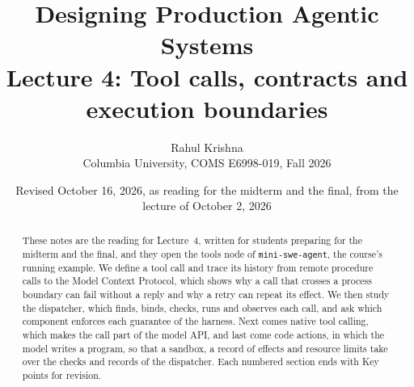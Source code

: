 \documentclass[9pt,twocolumn]{extarticle}
\title{Designing Production Agentic Systems\\Lecture 4: Tool calls, contracts and execution boundaries}
\author{Rahul Krishna\\Columbia University, COMS E6998-019, Fall 2026}
\date{Revised October 16, 2026, as reading for the midterm and the final, from the lecture of October 2, 2026}
\theoremstyle{definition}
\newcommand{\msa}{\texttt{mini-swe-agent}}     %
\begin{document}
\maketitle
\begin{abstract}
These notes are the reading for Lecture~4, written for students preparing for the midterm and the
final, and they open the tools node of \msa{}, the course's running example. We define a tool call
and trace its history from remote procedure calls to the Model Context Protocol, which shows why a
call that crosses a process boundary can fail without a reply and why a retry can repeat its effect.
We then study the dispatcher, which finds, binds, checks, runs and observes each call, and ask which
component enforces each guarantee of the harness. Next comes native tool calling, which makes the
call part of the model API, and last come code actions, in which the model writes a program, so
that a sandbox, a record of effects and resource limits take over the checks and records of the
dispatcher. Each numbered section ends with Key points for revision.
\end{abstract}
\tableofcontents







\clearpage


\end{document}
